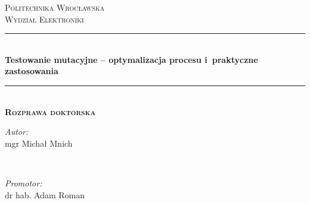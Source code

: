 \documentclass[11pt,a4paper,oldfontcommands]{memoir}
\theoremstyle{plain}
\theoremstyle{definition}
\theoremstyle{remark}
\newcommand{\HRule}{\rule{\linewidth}{0.5mm}} %
\begin{document}

\begin{center} %
 

\textsc{\LARGE Politechnika Wrocławska}\\[1.5cm] %
\textsc{\Large Wydział Elektroniki}\\[0.5cm] %


\HRule \\[0.4cm]
{ \huge \bfseries Testowanie mutacyjne -- optymalizacja procesu i~praktyczne zastosowania}\\[0.4cm] %
\HRule \\[1cm]

\textsc{\large \textbf{Rozprawa doktorska }}
\\[1.5cm]
 

\begin{minipage}{0.4\textwidth}
\begin{flushleft} \large
\emph{Autor:}\\
mgr Michał Mnich 
\end{flushleft}
\end{minipage}
~
\begin{minipage}{0.4\textwidth}
\begin{flushright} \large
\emph{Promotor:} \\
dr hab. Adam Roman
\end{flushright}
\end{minipage}\\[2cm]



\end{center}
\end{document}
